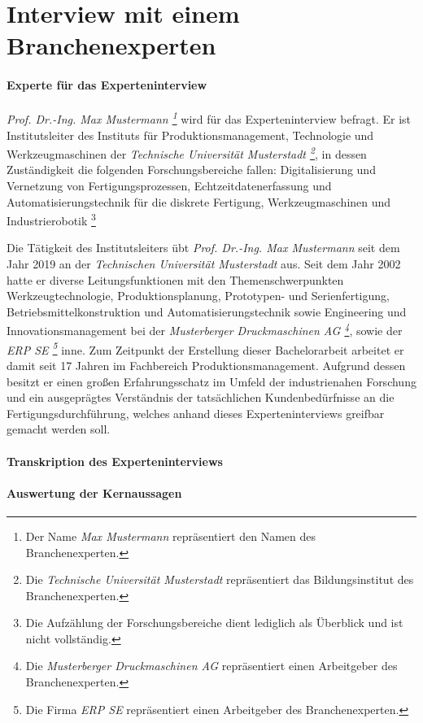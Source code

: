 \section*{Interview mit einem Branchenexperten}

\paragraph{Experte für das Experteninterview}
\textit{Prof. Dr.-Ing. Max Mustermann \footnote{Der Name \textit{Max Mustermann} repräsentiert den Namen des Branchenexperten.}} wird für das Experteninterview befragt.
Er ist Institutsleiter des Instituts für Produktionsmanagement, Technologie und Werkzeugmaschinen der \textit{Technische Universität Musterstadt \footnote{Die \textit{Technische Universität Musterstadt} repräsentiert das Bildungsinstitut des Branchenexperten.}}, in dessen Zuständigkeit die folgenden Forschungsbereiche fallen: Digitalisierung und Vernetzung von Fertigungsprozessen, Echtzeitdatenerfassung und Automatisierungstechnik für die diskrete Fertigung, Werkzeugmaschinen und Industrierobotik \footnote{Die Aufzählung der Forschungsbereiche dient lediglich als Überblick und ist nicht vollständig.}

Die Tätigkeit des Institutsleiters übt \textit{Prof. Dr.-Ing. Max Mustermann} seit dem Jahr 2019 an der \textit{Technischen Universität Musterstadt} aus. Seit dem Jahr 2002 hatte er diverse Leitungsfunktionen mit den Themenschwerpunkten Werkzeugtechnologie, Produktionsplanung, Prototypen- und Serienfertigung, Betriebsmittelkonstruktion und Automatisierungstechnik sowie Engineering und Innovationsmanagement bei der \textit{Musterberger Druckmaschinen AG \footnote{Die \textit{Musterberger Druckmaschinen AG} repräsentiert einen Arbeitgeber des Branchenexperten.}}, sowie der \textit{ERP SE \footnote{Die Firma \textit{ERP SE} repräsentiert einen Arbeitgeber des Branchenexperten.}} inne. Zum Zeitpunkt der Erstellung dieser Bachelorarbeit arbeitet er damit seit 17 Jahren im Fachbereich Produktionsmanagement. Aufgrund dessen besitzt er einen großen Erfahrungsschatz im Umfeld der industrienahen Forschung und ein ausgeprägtes Verständnis der tatsächlichen Kundenbedürfnisse an die Fertigungsdurchführung, welches anhand dieses Experteninterviews greifbar gemacht werden soll.

\paragraph{Transkription des Experteninterviews}
\paragraph{Auswertung der Kernaussagen}